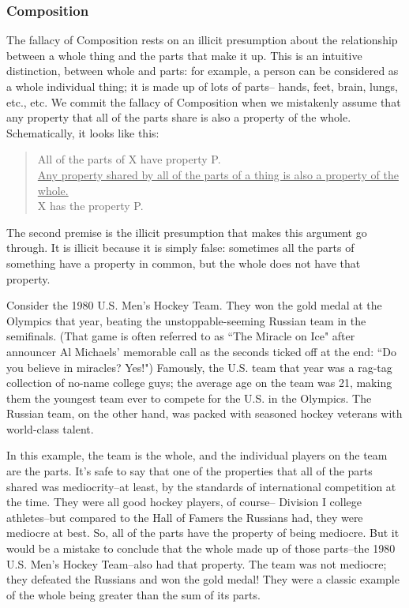 \subsubsection{Composition}
The fallacy of Composition rests on an illicit presumption about the relationship between a whole
thing and the parts that make it up. This is an intuitive distinction, between whole and parts: for
example, a person can be considered as a whole individual thing; it is made up of lots of parts--
hands, feet, brain, lungs, etc., etc. We commit the fallacy of Composition when we mistakenly
assume that any property that all of the parts share is also a property of the whole. Schematically,
it looks like this:

\begin{quote}
All of the parts of X have property P. \\
\underline{Any property shared by all of the parts of a thing is also a property of the whole.} \\
X has the property P.\end{quote}

The second premise is the illicit presumption that makes this argument go through. It is illicit
because it is simply false: sometimes all the parts of something have a property in common, but
the whole does not have that property.

Consider the 1980 U.S. Men's Hockey Team. They won the gold medal at the Olympics that year,
beating the unstoppable-seeming Russian team in the semifinals. (That game is often referred to
as ``The Miracle on Ice" after announcer Al Michaels' memorable call as the seconds ticked off at
the end: ``Do you believe in miracles? Yes!") Famously, the U.S. team that year was a rag-tag
collection of no-name college guys; the average age on the team was 21, making them the youngest
team ever to compete for the U.S. in the Olympics. The Russian team, on the other hand, was
packed with seasoned hockey veterans with world-class talent.

In this example, the team is the whole, and the individual players on the team are the parts. It's
safe to say that one of the properties that all of the parts shared was mediocrity--at least, by the
standards of international competition at the time. They were all good hockey players, of course--
Division I college athletes--but compared to the Hall of Famers the Russians had, they were
mediocre at best. So, all of the parts have the property of being mediocre. But it would be a mistake
to conclude that the whole made up of those parts--the 1980 U.S. Men's Hockey Team--also had
that property. The team was not mediocre; they defeated the Russians and won the gold medal!
They were a classic example of the whole being greater than the sum of its parts.

